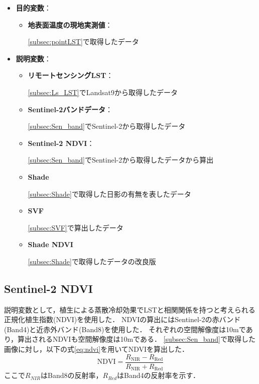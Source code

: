 \documentclass[12pt,epsf]{jreport}
\begin{document}
\begin{itemize}
    \item \textsf{\textbf{目的変数}}：

    \begin{itemize}
        \item \textbf{地表面温度の現地実測値}：
        
        \ref{subsec:pointLST}で取得したデータ
    \end{itemize}

    \item \textsf{\textbf{説明変数}}：

    \begin{itemize}
        \item \textbf{リモートセンシングLST}：
        
        \ref{subsec:Ls_LST}でLandsat9から取得したデータ
        \item \textbf{Sentinel-2バンドデータ}：
        
        \ref{subsec:Sen_band}でSentinel-2から取得したデータ
        \item \textbf{Sentinel-2 NDVI}：
        
        \ref{subsec:Sen_band}でSentinel-2から取得したデータから算出
        \item \textbf{Shade}

        \ref{subsec:Shade}で取得した日影の有無を表したデータ
        \item \textbf{SVF}

        \ref{subsec:SVF}で算出したデータ
        \item \textbf{Shade NDVI}

        \ref{subsec:Shade}で取得したデータの改良版
    \end{itemize}

\end{itemize}

\subsection{Sentinel-2 NDVI}
説明変数として，植生による蒸散冷却効果でLSTと相関関係を持つと考えられる正規化植生指数(NDVI)を使用した\cite{kustas2003estimating}．
NDVIの算出にはSentinel-2の赤バンド(Band4)と近赤外バンド(Band8)を使用した．
それぞれの空間解像度は10mであり，算出されるNDVIも空間解像度は10mである．
\ref{subsec:Sen_band}で取得した画像に対し，以下の式\ref{eq:ndvi}を用いてNDVIを算出した．
\begin{equation}
  \text{NDVI} = \frac{R_{\text{NIR}} - R_{\text{Red}}}{R_{\text{NIR}} + R_{\text{Red}}}
  \label{eq:ndvi}
\end{equation}
ここで$R_{NIR}$はBand8の反射率，$R_{Red}$はBand4の反射率を示す．
\end{document}
